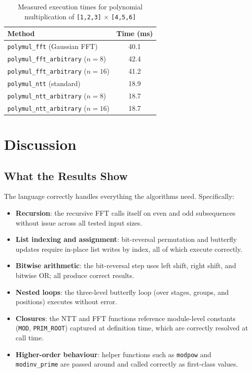 \documentclass[conference]{IEEEtran}
\begin{document}
\begin{table}[h]
\centering
\caption{Measured execution times for polynomial multiplication of \texttt{[1,2,3]} $\times$ \texttt{[4,5,6]}}
\begin{tabular}{lc}
\toprule
\textbf{Method} & \textbf{Time (ms)} \\
\midrule
\texttt{polymul\_fft} (Gaussian FFT)        & 40.1 \\
\texttt{polymul\_fft\_arbitrary} ($n=8$)    & 42.4 \\
\texttt{polymul\_fft\_arbitrary} ($n=16$)   & 41.2 \\
\midrule
\texttt{polymul\_ntt} (standard)            & 18.9 \\
\texttt{polymul\_ntt\_arbitrary} ($n=8$)    & 18.7 \\
\texttt{polymul\_ntt\_arbitrary} ($n=16$)   & 18.7 \\
\bottomrule
\end{tabular}
\end{table}

\section{Discussion}

\subsection{What the Results Show}

The language correctly handles everything the algorithms need. Specifically:

\begin{itemize}
    \item \textbf{Recursion}: the recursive FFT calls itself on even and odd subsequences without issue across all tested input sizes.
    \item \textbf{List indexing and assignment}: bit-reversal permutation and butterfly updates require in-place list writes by index, all of which execute correctly.
    \item \textbf{Bitwise arithmetic}: the bit-reversal step uses left shift, right shift, and bitwise OR; all produce correct results.
    \item \textbf{Nested loops}: the three-level butterfly loop (over stages, groups, and positions) executes without error.
    \item \textbf{Closures}: the NTT and FFT functions reference module-level constants (\texttt{MOD}, \texttt{PRIM\_ROOT}) captured at definition time, which are correctly resolved at call time.
    \item \textbf{Higher-order behaviour}: helper functions such as \texttt{modpow} and \texttt{modinv\_prime} are passed around and called correctly as first-class values.
\end{itemize}
\end{document}
